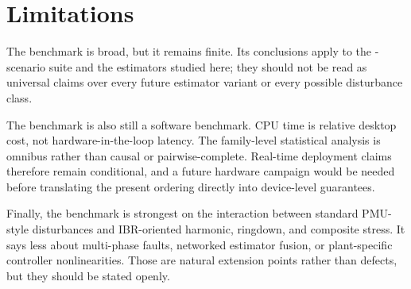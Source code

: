 \section{Limitations}
\label{sec:limitations}

The benchmark is broad, but it remains finite. Its conclusions apply to the \ArchivalScenarioCount{}-scenario suite and the \ArchivalEstimatorCount{} estimators studied here; they should not be read as universal claims over every future estimator variant or every possible disturbance class.

The benchmark is also still a software benchmark. CPU time is relative desktop cost, not hardware-in-the-loop latency. The family-level statistical analysis is omnibus rather than causal or pairwise-complete. Real-time deployment claims therefore remain conditional, and a future hardware campaign would be needed before translating the present ordering directly into device-level guarantees.

Finally, the benchmark is strongest on the interaction between standard PMU-style disturbances and IBR-oriented harmonic, ringdown, and composite stress. It says less about multi-phase faults, networked estimator fusion, or plant-specific controller nonlinearities. Those are natural extension points rather than defects, but they should be stated openly.
